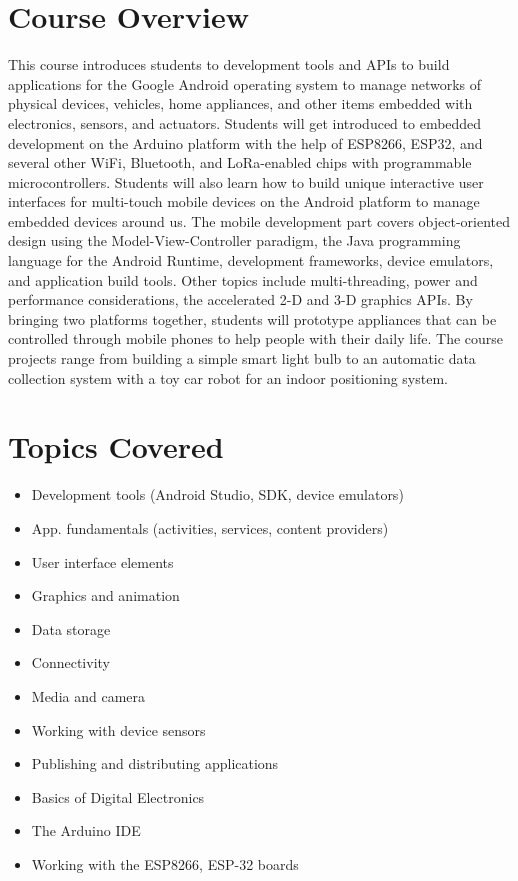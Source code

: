 \documentclass[12pt,a4paper,oneside]{article}
\begin{document}
    \section{Course Overview}

This course introduces students to development tools and APIs to build
applications for the Google Android operating system to manage
networks of physical devices, vehicles, home appliances, and other
items embedded with electronics, sensors, and actuators. Students will
get introduced to embedded development on the Arduino platform with
the help of ESP8266, ESP32, and several other WiFi, Bluetooth, and
LoRa-enabled chips with programmable microcontrollers. Students will
also learn how to build unique interactive user interfaces for
multi-touch mobile devices on the Android platform to manage embedded
devices around us. The mobile development part covers object-oriented
design using the Model-View-Controller paradigm, the Java programming
language for the Android Runtime, development frameworks, device
emulators, and application build tools. Other topics include
multi-threading, power and performance considerations, the accelerated
2-D and 3-D graphics APIs. By bringing two platforms together,
students will prototype appliances that can be controlled through
mobile phones to help people with their daily life. The course
projects range from building a simple smart light bulb to an automatic
data collection system with a toy car robot for an indoor positioning
system.

    \section{Topics Covered}

        \begin{itemize}
            \item Development tools (Android Studio, SDK, device emulators)
            \item App. fundamentals (activities, services, content providers)
            \item User interface elements
            \item Graphics and animation
            \item Data storage
            \item Connectivity
            \item Media and camera
            \item Working with device sensors
            \item Publishing and distributing applications
            \item Basics of Digital Electronics
            \item The Arduino IDE
            \item Working with the ESP8266, ESP-32 boards
        \end{itemize}
\end{document}
